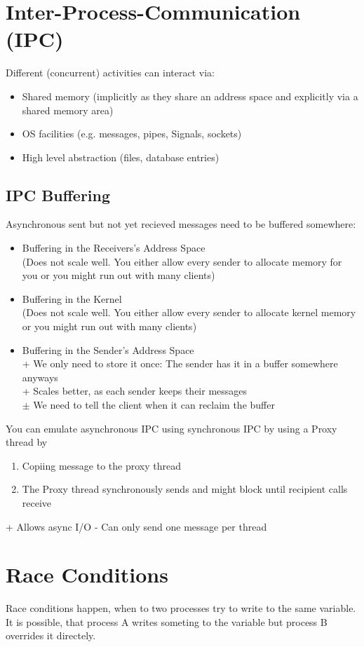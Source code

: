 \documentclass{kit}
\begin{document}
\section{Inter-Process-Communication (IPC)}
  Different (concurrent) activities can interact via:
  \begin{itemize}
    \item Shared memory (implicitly as they share an address space and explicitly via a shared memory area)
    \item OS facilities (e.g. messages, pipes, Signals, sockets)
    \item High level abstraction (files, database entries)
  \end{itemize}
  \subsection{IPC Buffering}
    Asynchronous sent but not yet recieved messages need to be buffered somewhere:
    \begin{itemize}
      \item Buffering in the Receivers's Address Space\\
        (Does not scale well. You either allow every sender to allocate memory for you or you might run out with many 
        clients)
      \item Buffering in the Kernel\\
        (Does not scale well. You either allow every sender to allocate kernel memory or you might run out with many 
        clients)
      \item Buffering in the Sender's Address Space\\
        + We only need to store it once: The sender has it in a buffer somewhere anyways\\
        + Scales better, as each sender keeps their messages\\
        $\pm$ We need to tell the client when it can reclaim the buffer
    \end{itemize}
    You can emulate asynchronous IPC using synchronous IPC by using a Proxy thread by
    \begin{enumerate}[label=\arabic*.]
      \item Copiing message to the proxy thread
      \item The Proxy thread synchronously sends and might block until recipient calls receive
    \end{enumerate}
    + Allows async I/O
    - Can only send one message per thread
\section{Race Conditions}
  Race conditions happen, when to two processes try to write to the same variable. It is possible, that process A writes 
  someting to the variable but process B overrides it directely.\\
\end{document}
